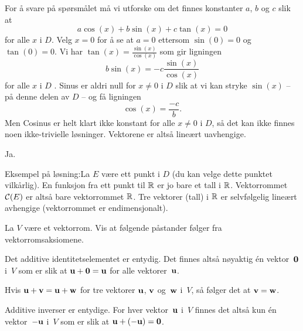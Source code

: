 \begin{losning}
\begin{punkt}
For å svare på spørsmålet må vi utforske om det finnes konstanter $a$, $b$ og $c$ slik at $$a\cos(x)+b\sin(x)+c\tan(x)=0$$ for alle $x$ i $D$. Velg $x=0$ for å se at $a=0$ ettersom $\sin(0)=0$ og $\tan(0)=0$. Vi har $\tan(x)=\frac{\sin(x)}{\cos(x)}$ som gir ligningen $$b\sin(x)=-c\frac{\sin(x)}{\cos(x)}$$ for alle $x$ i $D$ . Sinus er aldri null for $x\neq 0$ i $D$ slik at vi kan stryke $\sin(x)$ -- på denne delen av $D$ -- og få ligningen $$\cos(x)=\frac{-c}{b}.$$ Men Cosinus er helt klart ikke konstant for alle $x\neq 0$ i $D$, så det kan ikke finnes noen ikke-trivielle løsninger. Vektorene er altså lineært uavhengige.
\end{punkt}

\begin{punkt}
Ja. 

\noindent
Eksempel på løsning:La $E$ være ett punkt i $D$ (du kan velge dette punktet vilkårlig). En funksjon fra ett punkt til $\mathbb{R}$ er jo bare et tall i $\mathbb{R}$. Vektorrommet $\mathcal{C}(E)$ er altså bare vektorrommet $\mathbb{R}$. Tre vektorer (tall) i $\mathbb{R}$ er selvfølgelig lineært avhengige (vektorrommet er endimensjonalt).
\end{punkt}

\end{losning}


\begin{oppgave}
La $V$ være et vektorrom.
Vis at følgende påstander følger fra vektorromsaksiomene.
\begin{punkt}
Det additive identitetselementet er entydig.  Det finnes altså
nøyaktig én vektor~$\mathbf{0}$ i~$V$ som er slik at
$\mathbf{u} + \mathbf{0} = \mathbf{u}$ for alle vektorer~$\mathbf{u}$.
\end{punkt}
\begin{punkt}
Hvis $\mathbf{u} + \mathbf{v} = \mathbf{u} + \mathbf{w}$ for tre vektorer $\mathbf{u}$, $\mathbf{v}$
og~$\mathbf{w}$ i~$V$, så følger det at $\mathbf{v} = \mathbf{w}$.
\end{punkt}
\begin{punkt}
Additive inverser er entydige.  For hver vektor~$\mathbf{u}$ i~$V$ finnes
det altså kun én vektor~$-\mathbf{u}$ i~$V$ som er slik at
$\mathbf{u} + (-\mathbf{u}) = \mathbf{0}$.
\end{punkt}
\end{oppgave}

